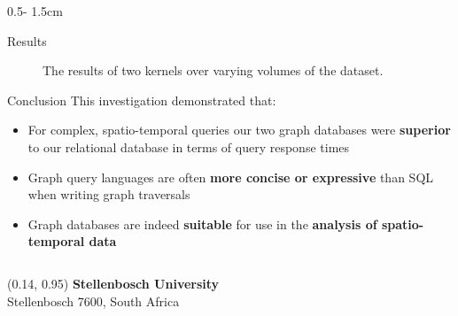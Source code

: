 \documentclass{uioposter}
\begin{document}
\begin{frame}
\begin{columns}[onlytextwidth]
\begin{column}{0.5\textwidth - 1.5cm}
\begin{block}{Results}
\begin{figure}
            \caption{The results of two kernels over varying volumes of the dataset.}
            \label{fig:results}
        \end{figure}
    \end{block}

    \begin{block}{Conclusion}
        This investigation demonstrated that:
        \vfill
        \begin{itemize}
            \item For complex, spatio-temporal queries our two graph databases were \textbf{superior} to our relational database in terms of query response times
            \item Graph query languages are often \textbf{more concise or expressive} than SQL when writing graph traversals
            \item Graph databases are indeed \textbf{suitable} for use in the \textbf{analysis of spatio-temporal data}
        \end{itemize}
    \end{block}
\end{column}


\end{columns}


\begin{textblock}{0.5}(0.14, 0.95)
    \color{white}
    \sffamily
    \small
    \textbf{Stellenbosch University}
    \\
    Stellenbosch 7600, South Africa
\end{textblock}


\end{frame}
\end{document}
